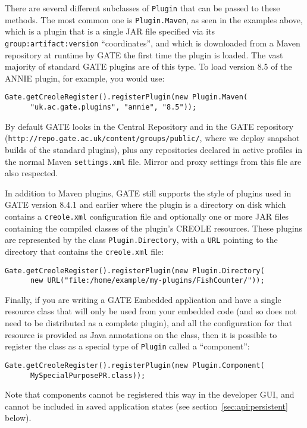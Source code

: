 There are several different subclasses of \texttt{Plugin} that can be passed
to these methods.  The most common one is \texttt{Plugin.Maven}, as seen in the
examples above, which is a plugin that is a single JAR file specified via its
\texttt{group:artifact:version} ``coordinates'', and which is downloaded from a
Maven repository at runtime by GATE the first time the plugin is loaded.  The
vast majority of standard GATE plugins are of this type.  To load version 8.5
of the ANNIE plugin, for example, you would use:
\begin{lstlisting}
Gate.getCreoleRegister().registerPlugin(new Plugin.Maven(
      "uk.ac.gate.plugins", "annie", "8.5"));
\end{lstlisting}
By default GATE looks in the Central Repository and in the GATE repository
(\verb!http://repo.gate.ac.uk/content/groups/public/!, where we deploy snapshot
builds of the standard plugins), plus any repositories declared in active
profiles in the normal Maven \verb!settings.xml! file.  Mirror and proxy
settings from this file are also respected.

In addition to Maven plugins, GATE still supports the style of plugins used in
GATE version 8.4.1 and earlier where the plugin is a directory on disk
which contains a \texttt{creole.xml} configuration file and optionally one or
more JAR files containing the compiled classes of the plugin's CREOLE
resources.  These plugins are represented by the class
\texttt{Plugin.Directory}, with a \texttt{URL} pointing to the directory that
contains the \texttt{creole.xml} file:
\begin{lstlisting}
Gate.getCreoleRegister().registerPlugin(new Plugin.Directory(
      new URL("file:/home/example/my-plugins/FishCounter/"));
\end{lstlisting}

Finally, if you are writing a GATE Embedded application and have a single
resource class that will only be used from your embedded code (and so does not
need to be distributed as a complete plugin), and all the configuration for
that resource is provided as Java annotations on the class, then it is possible
to register the class as a special type of \texttt{Plugin} called a
``component'':
\begin{lstlisting}
Gate.getCreoleRegister().registerPlugin(new Plugin.Component(
      MySpecialPurposePR.class));
\end{lstlisting}

Note that components cannot be registered this way in the developer GUI, and
cannot be included in saved application states (see
section~\ref{sec:api:persistent} below).


